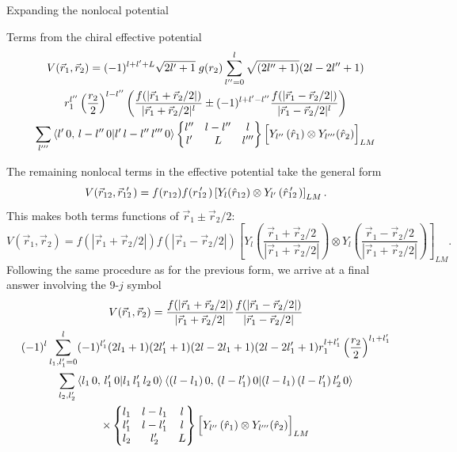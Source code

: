 \begin{section}{Expanding the nonlocal potential}
\begin{subsection}{Terms from the chiral effective potential}
\begin{multline}
V(\vec{r}_1,\vec{r}_2)=(-1)^{l+l'+L}\sqrt{2l'+1}\;g(r_2) \sum_{l''=0}^{l} \sqrt{(2l''+1)}(2l-2l''+1)  \\
  r_1^{l''} \left(\frac{r_2}{2}\right)^{l-l''} \left(\frac{f(|\vec{r}_1+\vec{r}_2/2|)}{|\vec{r}_1+\vec{r}_2/2|^{l} } \pm (-1)^{l+l'-l''} \frac{f(|\vec{r}_1-\vec{r}_2/2|)}{|\vec{r}_1-\vec{r}_2/2|^{l} }\right) \\
\sum_{l'''} \braket{l'\,0,\,l-l''\,0 | l'\,l-l''\,l'''\,0} \begin{Bmatrix} l'' & l-l'' & l \\ l' & L & l''' \end{Bmatrix} \Big[Y_{l''}\left(\hat{r}_1\right) \otimes Y_{l'''}(\hat{r}_2) \Big]_{L M} 
\end{multline}

The remaining nonlocal terms in the effective potential take the general form
\begin{equation}
V(\rot,\rotp)=f(r_{12})f(\rotpr) \left[Y_{l}(\hat{r}_{12})\otimes Y_{l'}\left(\rotphat \right)\right]_{L M}.
\end{equation}
This makes both terms functions of $\vec{r}_1\pm\vec{r}_2/2$:
\begin{equation}\label{eq:r1r2Form1}
V(\vec{r}_1,\vec{r}_2)=f(|\vec{r}_1+\vec{r}_2/2|)f(|\vec{r}_1-\vec{r}_2/2|) \left[Y_{l}\left(\frac{\vec{r}_1+\vec{r}_2/2}{|\vec{r}_1+\vec{r}_2/2|}\right)\otimes Y_{l}\left(\frac{\vec{r}_1-\vec{r}_2/2}{|\vec{r}_1+\vec{r}_2/2|}\right) \right]_{L M}.
\end{equation} 
Following the same procedure as for the previous form, we arrive at a final answer involving the 9-$j$ symbol
\begin{multline}
V(\vec{r}_1,\vec{r}_2)=\frac{f(|\vec{r}_1+\vec{r}_2/2|)}{|\vec{r}_1+\vec{r}_2/2|}\frac{f(|\vec{r}_1-\vec{r}_2/2|)}{|\vec{r}_1-\vec{r}_2/2|} \\
(-1)^{l} \sum_{l_1,l'_1=0}^{l} (-1)^{l'_1}(2l_1+1)(2l'_1+1)(2l-2l_1+1)(2l-2l'_1+1) r_1^{l+l'_1} \left(\frac{r_2}{2}\right)^{l_1+l'_1}  \\
\sum_{l_2,l'_2} \braket{l_1\,0,\,l'_1\,0 | l_1\,l'_1\,l_2\,0}\braket{(l-l_1)\,0,\,(l-l'_1)\,0 | (l-l_1)\,(l-l'_1)\,l'_2\,0} \\
\times\begin{Bmatrix} l_1 & l-l_1 & l \\ l'_1 & l-l'_1 & l \\ l_2 & l'_2 & L \end{Bmatrix} \Big[Y_{l''}\left(\hat{r}_1\right) \otimes Y_{l'''}(\hat{r}_2) \Big]_{L M} 
\end{multline}


\end{subsection}

\end{section}
